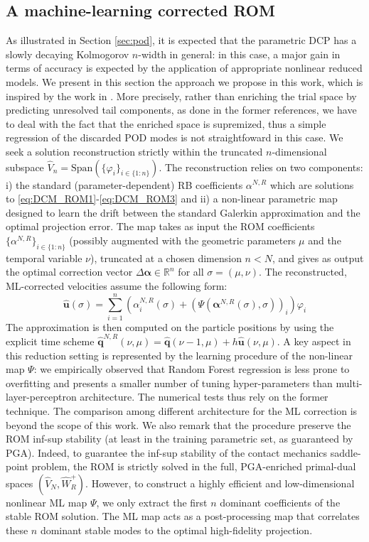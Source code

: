 \subsection{A machine-learning corrected ROM}
\label{sec:ML_correction}
As illustrated in Section \ref{sec:pod}, it is expected that the parametric DCP has a slowly decaying Kolmogorov $n$-width in general: in this case, a major gain in terms of accuracy is expected by the application of appropriate nonlinear reduced models. We present in this section the approach we propose in this work, which is inspired by the work in \cite{cohen2023nonlinear, barnett2023neural}. More precisely, rather than enriching the trial space by predicting unresolved tail components, as done in the former references, we have to deal with the fact that the enriched space is supremized, thus a simple regression of the discarded POD modes is not straightfoward in this case. We seek a solution reconstruction strictly within the truncated $n$-dimensional subspace $\hat{V}_{n} = \text{Span}(\{\varphi_i\}_{i \in \{1:n\}})$. The reconstruction relies on two components: i) the standard (parameter-dependent) RB coefficients $\alpha^{N,R}$ which are solutions to \eqref{eq:DCM_ROM1}-\eqref{eq:DCM_ROM3} and ii) a non-linear parametric map designed to learn the drift between the standard Galerkin approximation and the optimal projection error. 
The map takes as input the ROM coefficients $\{\alpha^{N,R}\}_{i \in \{1:n\}}$ (possibly augmented with the geometric parameters $\mu$ and the temporal variable $\nu$), truncated at a chosen dimension $n<N$, and gives as output the optimal correction vector $\Delta \boldsymbol{\alpha} \in \mathbb{R}^n$ for all $\sigma=(\mu, \nu)$. 
The reconstructed, ML-corrected velocities assume the following form: \[ \hat{\mathbf{u}}(\sigma)=\sum_{i=1}^n \left( \alpha^{N,R}_i(\sigma) + \left(\Psi(\boldsymbol{\alpha}^{N,R}(\sigma), \sigma) \right)_i \right) \varphi_i \]
The approximation is then computed on the particle positions by using the explicit time scheme
$\hat{\mathbf{q}}^{N,R}(\nu,\mu)=\hat{\mathbf{q}}(\nu-1,\mu)+h \hat{\mathbf{u}}(\nu,\mu)$.
A key aspect in this reduction setting is represented by the learning procedure of the non-linear map $\Psi$: we empirically observed that Random Forest regression is less prone to overfitting and presents a smaller number of tuning hyper-parameters than multi-layer-perceptron architecture. The numerical tests thus rely on the former technique. The comparison among different architecture for the ML correction is beyond the scope of this work.
We also remark that the procedure preserve the ROM inf-sup stability (at least in the training parametric set, as guaranteed by PGA). Indeed, to guarantee the inf-sup stability of the contact mechanics saddle-point problem, the ROM is strictly solved in the full, PGA-enriched primal-dual spaces $(\hat{V}_N, \hat{W}^+_R)$. However, to construct a highly efficient and low-dimensional nonlinear ML map $\Psi$, we only extract the first $n$ dominant coefficients of the stable ROM solution. The ML map acts as a post-processing map that correlates these $n$ dominant stable modes to the optimal high-fidelity projection. 

